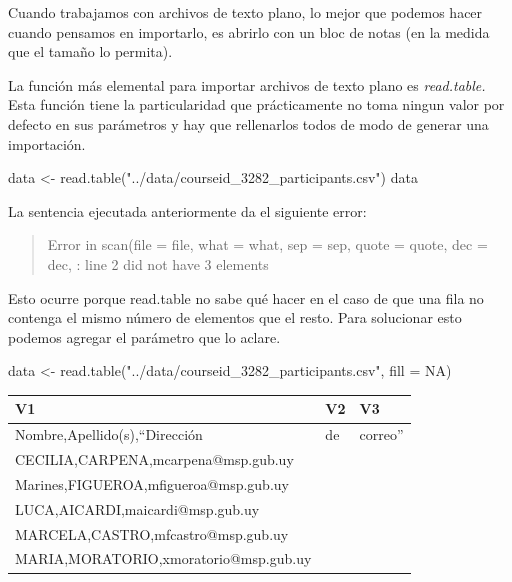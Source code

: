 \documentclass[
  letterpaper,
  DIV=11,
  numbers=noendperiod]{scrreprt}
\newenvironment{Shaded}{\begin{snugshade}}{\end{snugshade}}
\newcommand{\AttributeTok}[1]{\textcolor[rgb]{0.40,0.45,0.13}{#1}}
\newcommand{\ConstantTok}[1]{\textcolor[rgb]{0.56,0.35,0.01}{#1}}
\newcommand{\FunctionTok}[1]{\textcolor[rgb]{0.28,0.35,0.67}{#1}}
\newcommand{\NormalTok}[1]{\textcolor[rgb]{0.00,0.23,0.31}{#1}}
\newcommand{\OtherTok}[1]{\textcolor[rgb]{0.00,0.23,0.31}{#1}}
\newcommand{\StringTok}[1]{\textcolor[rgb]{0.13,0.47,0.30}{#1}}
\begin{document}
Cuando trabajamos con archivos de texto plano, lo mejor que podemos
hacer cuando pensamos en importarlo, es abrirlo con un bloc de notas (en
la medida que el tamaño lo permita).

La función más elemental para importar archivos de texto plano es
\emph{read.table.} Esta función tiene la particularidad que
prácticamente no toma ningun valor por defecto en sus parámetros y hay
que rellenarlos todos de modo de generar una importación.

\begin{Shaded}
\begin{Highlighting}[]
\NormalTok{data }\OtherTok{\textless{}{-}} \FunctionTok{read.table}\NormalTok{(}\StringTok{"../data/courseid\_3282\_participants.csv"}\NormalTok{)}
\NormalTok{data}
\end{Highlighting}
\end{Shaded}

La sentencia ejecutada anteriormente da el siguiente error:

\begin{quote}
Error in scan(file = file, what = what, sep = sep, quote = quote, dec =
dec, : line 2 did not have 3 elements
\end{quote}

Esto ocurre porque read.table no sabe qué hacer en el caso de que una
fila no contenga el mismo número de elementos que el resto. Para
solucionar esto podemos agregar el parámetro que lo aclare.

\begin{Shaded}
\begin{Highlighting}[]
\NormalTok{data }\OtherTok{\textless{}{-}} \FunctionTok{read.table}\NormalTok{(}\StringTok{"../data/courseid\_3282\_participants.csv"}\NormalTok{, }\AttributeTok{fill =} \ConstantTok{NA}\NormalTok{)}
\end{Highlighting}
\end{Shaded}

\begin{longtable}[]{@{}lll@{}}
\toprule()
V1 & V2 & V3 \\
\midrule()
\endhead
Nombre,Apellido(s),``Dirección & de & correo'' \\
CECILIA,CARPENA,mcarpena@msp.gub.uy & & \\
Marines,FIGUEROA,mfigueroa@msp.gub.uy & & \\
LUCA,AICARDI,maicardi@msp.gub.uy & & \\
MARCELA,CASTRO,mfcastro@msp.gub.uy & & \\
MARIA,MORATORIO,xmoratorio@msp.gub.uy & & \\
\bottomrule()
\end{longtable}
\end{document}
